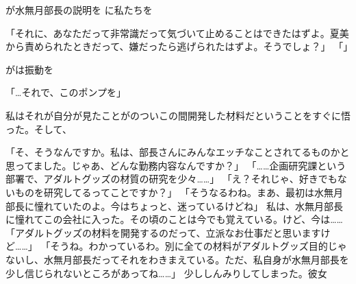 が水無月部長の説明を
に私たちを






「それに、あなただって非常識だって気づいて止めることはできたはずよ。夏美から責められたときだって、嫌だったら逃げられたはずよ。そうでしょ？」
「」



がは振動を




「…それで、このポンプを」












私はそれが自分が見たことがのついこの間開発した材料だということをすぐに悟った。そして、





「そ、そうなんですか。私は、部長さんにみんなエッチなことされてるものかと思ってました。じゃあ、どんな勤務内容なんですか？」
「……企画研究課という部署で、アダルトグッズの材質の研究を少々……」
「え？それじゃ、好きでもないものを研究してるってことですか？」
「そうなるわね。まあ、最初は水無月部長に憧れていたのよ。今はちょっと、迷っているけどね」
私は、水無月部長に憧れてこの会社に入った。その頃のことは今でも覚えている。けど、今は……
「アダルトグッズの材料を開発するのだって、立派なお仕事だと思いますけど……」
「そうね。わかっているわ。別に全ての材料がアダルトグッズ目的じゃないし、水無月部長だってそれをわきまえている。ただ、私自身が水無月部長を少し信じられないところがあってね……」
少ししんみりしてしまった。彼女


